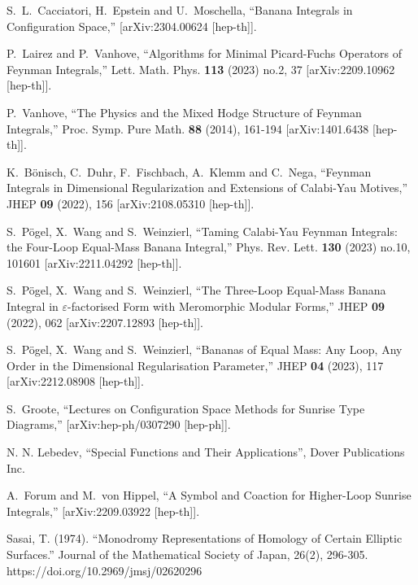 \documentclass[a4paper,12pt]{article}
\numberwithin{equation}{section}
\numberwithin{figure}{section}
\begin{document}
\begin{thebibliography}{99}
S.~L.~Cacciatori, H.~Epstein and U.~Moschella,
``Banana Integrals in Configuration Space,''
[arXiv:2304.00624 [hep-th]].
  
P.~Lairez and P.~Vanhove,
``Algorithms for Minimal Picard-Fuchs Operators of Feynman Integrals,''
Lett. Math. Phys. \textbf{113} (2023) no.2, 37
[arXiv:2209.10962 [hep-th]].

  
P.~Vanhove,
``The Physics and the Mixed Hodge Structure of Feynman Integrals,''
Proc. Symp. Pure Math. \textbf{88} (2014), 161-194
[arXiv:1401.6438 [hep-th]].


K.~B\"onisch, C.~Duhr, F.~Fischbach, A.~Klemm and C.~Nega,
``Feynman Integrals in Dimensional Regularization and Extensions of Calabi-Yau Motives,''
JHEP \textbf{09} (2022), 156
[arXiv:2108.05310 [hep-th]].


S.~P\"ogel, X.~Wang and S.~Weinzierl,
``Taming Calabi-Yau Feynman Integrals: the Four-Loop Equal-Mass Banana Integral,''
Phys. Rev. Lett. \textbf{130} (2023) no.10, 101601
[arXiv:2211.04292 [hep-th]].

S.~P\"ogel, X.~Wang and S.~Weinzierl,
``The Three-Loop Equal-Mass Banana Integral in \ensuremath{\varepsilon}-factorised Form with Meromorphic Modular Forms,''
JHEP \textbf{09} (2022), 062
[arXiv:2207.12893 [hep-th]].

S.~P\"ogel, X.~Wang and S.~Weinzierl,
``Bananas of Equal Mass: Any Loop, Any Order in the Dimensional Regularisation Parameter,''
JHEP \textbf{04} (2023), 117
[arXiv:2212.08908 [hep-th]].

S.~Groote,
``Lectures on Configuration Space Methods for Sunrise Type Diagrams,''
[arXiv:hep-ph/0307290 [hep-ph]].
  
 N. N. Lebedev, ``Special Functions and Their
  Applications'', Dover Publications Inc. 

A.~Forum and M.~von Hippel,
``A Symbol and Coaction for Higher-Loop Sunrise Integrals,''
[arXiv:2209.03922 [hep-th]].

 Sasai, T. (1974). ``Monodromy Representations of
  Homology of Certain Elliptic Surfaces.'' Journal of the Mathematical
  Society of Japan, 26(2),
  296-305. https://doi.org/10.2969/jmsj/02620296


\end{thebibliography}
\end{document}
